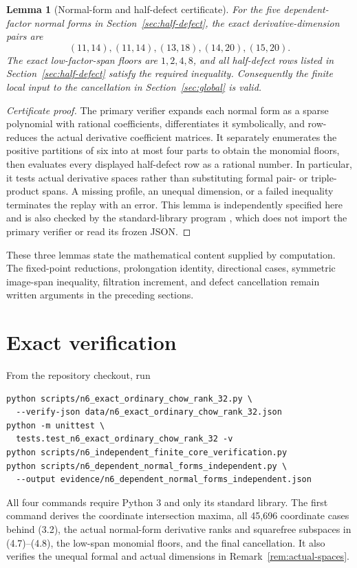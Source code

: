 \documentclass[11pt]{amsart}
\newtheorem{lemma}[theorem]{Lemma}
\theoremstyle{definition}
\begin{document}
\begin{lemma}[Normal-form and half-defect certificate]
\label{lem:certificate-half-defect}
For the five dependent-factor normal forms in
Section~\ref{sec:half-defect}, the exact derivative-dimension pairs are
\[
 (11,14),(11,14),(13,18),(14,20),(15,20).
\]
The exact low-factor-span floors are \(1,2,4,8\), and all half-defect rows
listed in Section~\ref{sec:half-defect} satisfy the required inequality.
Consequently the finite
local input to the cancellation in Section~\ref{sec:global} is valid.
\end{lemma}

\begin{proof}[Certificate proof]
The primary verifier expands each normal form as a sparse polynomial with
rational coefficients, differentiates it symbolically, and row-reduces the
actual derivative coefficient matrices. It separately enumerates the positive
partitions of six into at most four parts to obtain the monomial floors, then
evaluates every displayed half-defect row as a rational number. In particular,
it tests actual derivative spaces rather than substituting formal pair- or
triple-product spans. A missing profile, an unequal dimension, or a failed
inequality terminates the replay with an error. This lemma is independently
specified here and is also checked by the standard-library program
, which does not import
the primary verifier or read its frozen JSON.
\end{proof}

These three lemmas state the mathematical content supplied by computation.
The fixed-point reductions, prolongation identity, directional cases,
symmetric image-span inequality, filtration increment, and defect cancellation
remain written arguments in the preceding sections.

\section{Exact verification}

From the repository checkout, run
\begin{verbatim}
python scripts/n6_exact_ordinary_chow_rank_32.py \
  --verify-json data/n6_exact_ordinary_chow_rank_32.json
python -m unittest \
  tests.test_n6_exact_ordinary_chow_rank_32 -v
python scripts/n6_independent_finite_core_verification.py
python scripts/n6_dependent_normal_forms_independent.py \
  --output evidence/n6_dependent_normal_forms_independent.json
\end{verbatim}
All four commands require Python 3 and only its standard library. The first
command derives the coordinate intersection maxima, all 45,696
coordinate cases behind (3.2), the actual normal-form derivative ranks and
squarefree subspaces in (4.7)--(4.8), the low-span monomial floors, and the
final cancellation. It also verifies the unequal formal and actual dimensions
in Remark~\ref{rem:actual-spaces}.
\end{document}
